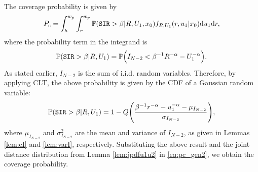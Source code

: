 \documentclass[journal,draftclsnofoot,onecolumn,12pt]{IEEEtran}
\begin{document}
\begin{IEEEproof}
The coverage probability is given by
\begin{equation}\label{eq:pc_gen2}
P_c = \int_h^{w_p} \int_{r}^{w_p} \mathbb{P}(\mathtt{SIR}> \beta | R,U_1,x_0)f_{R,U_1}(r,u_1| x_0) {\rm d}u_1 {\rm d}r,
\end{equation}
where the probability term in the integrand is
\begin{equation}
\mathbb{P}(\mathtt{SIR} > \beta | R, U_1) = \mathbb{P}\Big(I_{N-2} < \beta^{-1} R^{-\alpha} - U_1^{-\alpha} \Big).
\end{equation}
As stated earlier, $I_{N-2}$ is the sum of i.i.d. random variables. Therefore, by applying CLT, the above probability is given by the CDF of a Gaussian random variable:
\begin{equation}
\mathbb{P}(\mathtt{SIR}> \beta | R, U_1) = 1 - Q \Bigg( \frac{\beta^{-1} r^{-\alpha} - u_1^{-\alpha} - \mu_{I_{N-2}}}{\sigma_{I_{N-2}}} \Bigg),
\end{equation}
where $\mu_{I_{N-2}}$ and $\sigma_{I_{N-2}}^2$ are the mean and variance of $I_{N-2}$, as given in Lemmas \ref{lem:eI} and \ref{lem:varI}, respectively. Substituting the above result and the joint distance distribution from Lemma \ref{lem:jpdfu1u2} in \eqref{eq:pc_gen2}, we obtain the coverage probability.%
\end{IEEEproof}
\end{document}
